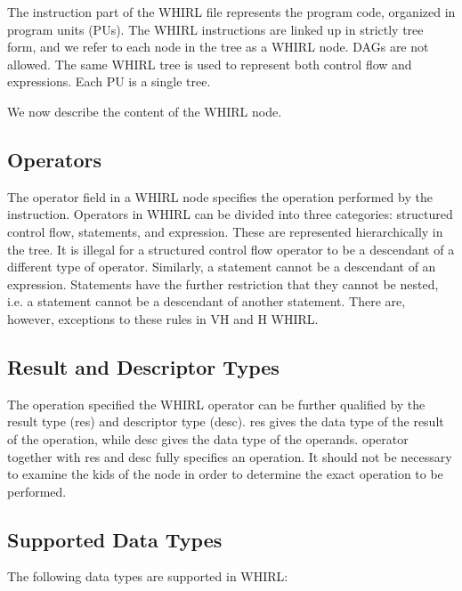 \documentclass{article}
\begin{document}
The instruction part of the WHIRL file represents the
program code, organized in program units (PUs). The WHIRL instructions
are linked up in strictly tree form, and we refer to each node in
the tree as a WHIRL node. DAGs are not allowed. The same WHIRL tree
is used to represent both control flow and expressions. Each PU is
a single tree. 

We now describe the content of the WHIRL node.

\subsection{Operators}

The operator field in a WHIRL node specifies the operation performed by
the instruction. Operators in WHIRL can be divided into three
categories: structured control flow, statements, and expression.
These are represented hierarchically in the tree. It is illegal
for a structured control flow operator to be a descendant of a
different type of operator. Similarly, a statement cannot be a
descendant of an expression. Statements have the further restriction
that they cannot be nested, i.e. a statement cannot be a  descendant
of another statement. There are, however, exceptions to these rules
in VH and H WHIRL.

\subsection{Result and Descriptor Types}

The operation specified the WHIRL operator can be further qualified
by the result type (res) and descriptor type (desc). res gives the
data type of the result of the operation, while desc gives the data
type of the operands. operator together with res and desc fully
specifies an operation. It should not be necessary to examine the
kids of the node in order to determine the exact operation to be
performed.

\subsection{Supported Data Types}

The following data types are supported in WHIRL:
\end{document}
